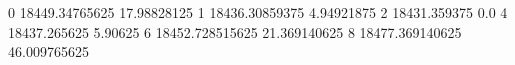 0 18449.34765625 17.98828125
1 18436.30859375 4.94921875
2 18431.359375 0.0
4 18437.265625 5.90625
6 18452.728515625 21.369140625
8 18477.369140625 46.009765625
